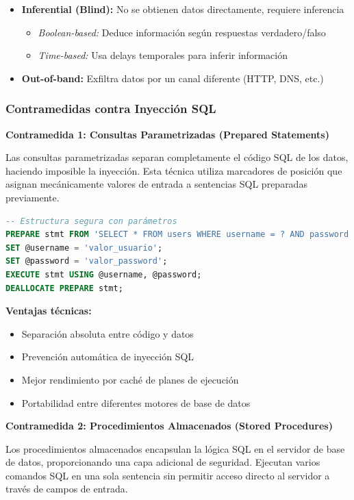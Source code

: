 {\begin{itemize}
    \item \textbf{Inferential (Blind):} No se obtienen datos directamente, requiere inferencia
    \begin{itemize}
        \item \textit{Boolean-based:} Deduce información según respuestas verdadero/falso
        \item \textit{Time-based:} Usa delays temporales para inferir información
    \end{itemize}
    
    \item \textbf{Out-of-band:} Exfiltra datos por un canal diferente (HTTP, DNS, etc.)
\end{itemize}

\subsubsection{Contramedidas contra Inyección SQL}

\textbf{Contramedida 1: Consultas Parametrizadas (Prepared Statements)}

Las consultas parametrizadas separan completamente el código SQL de los datos, haciendo imposible la inyección. Esta técnica utiliza marcadores de posición que asignan mecánicamente valores de entrada a sentencias SQL preparadas previamente.

\begin{lstlisting}[language=SQL, caption=Implementación segura con consultas parametrizadas]
-- Estructura segura con parámetros
PREPARE stmt FROM 'SELECT * FROM users WHERE username = ? AND password = ?';
SET @username = 'valor_usuario';
SET @password = 'valor_password';
EXECUTE stmt USING @username, @password;
DEALLOCATE PREPARE stmt;
\end{lstlisting}

\textbf{Ventajas técnicas:}
\begin{itemize}
    \item Separación absoluta entre código y datos
    \item Prevención automática de inyección SQL
    \item Mejor rendimiento por caché de planes de ejecución
    \item Portabilidad entre diferentes motores de base de datos
\end{itemize}

\textbf{Contramedida 2: Procedimientos Almacenados (Stored Procedures)}

Los procedimientos almacenados encapsulan la lógica SQL en el servidor de base de datos, proporcionando una capa adicional de seguridad. Ejecutan varios comandos SQL en una sola sentencia sin permitir acceso directo al servidor a través de campos de entrada.

}
